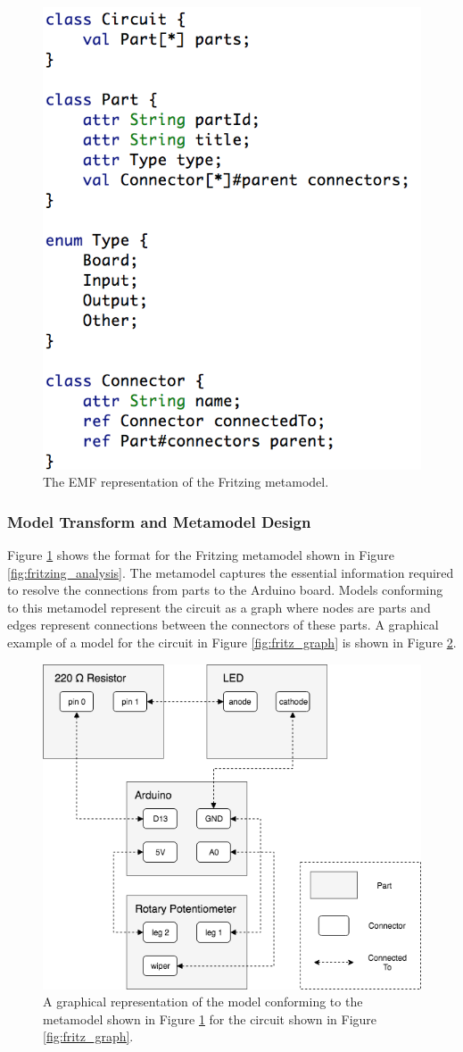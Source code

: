 \documentclass{UoYCSproject}
\begin{document}
\begin{figure}[h!]
  \centering
  \includegraphics[width=0.4\linewidth]{graphics/fritz_metamodel.png}
  \caption{The EMF representation of the Fritzing metamodel.}
  \label{fig:fritz_metamodel}
\end{figure}

\subsubsection{Model Transform and Metamodel Design}
Figure \ref{fig:fritz_metamodel} shows the format for the Fritzing metamodel shown in Figure \ref{fig:fritzing_analysis}. The metamodel captures the essential information required to resolve the connections from parts to the Arduino board. Models conforming to this metamodel represent the circuit as a graph where nodes are parts and edges represent connections between the connectors of these parts. A graphical example of a model for the circuit in Figure \ref{fig:fritz_graph} is shown in Figure \ref{fig:fritz_model}.

\begin{figure}[h!]
  \centering
  \includegraphics[width=0.6\linewidth]{graphics/fritz_model.png}
  \caption{A graphical representation of the model conforming to the metamodel shown in Figure \ref{fig:fritz_metamodel} for the circuit shown in Figure \ref{fig:fritz_graph}.}
  \label{fig:fritz_model}
\end{figure}
\end{document}
